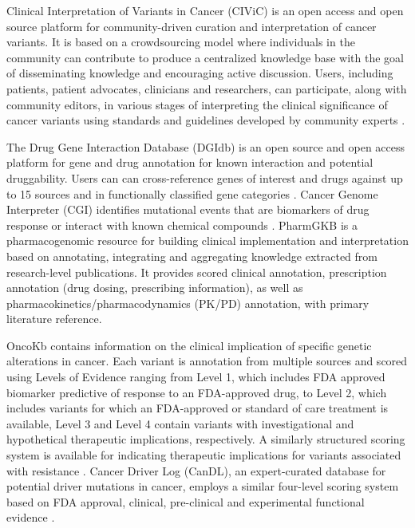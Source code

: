 \documentclass{article}
\begin{document}
Clinical Interpretation of Variants in Cancer (CIViC) is an open
access and open source platform for community-driven curation and
interpretation of cancer variants. It is based on a crowdsourcing
model where individuals in the community can contribute to produce a
centralized knowledge base with the goal of disseminating knowledge
and encouraging active discussion. Users, including patients, patient
advocates, clinicians and researchers, can participate, along with
community editors, in various stages of interpreting the clinical
significance of cancer variants using standards and guidelines
developed by community experts \parencite{Li2017-aw,Griffith2016-sy}.

The Drug Gene Interaction Database (DGIdb) is an open source and open
access platform for gene and drug annotation for known interaction and
potential druggability. Users can can cross-reference genes of
interest and drugs against up to 15 sources and in functionally
classified gene categories
\parencite{Wagner2016-fs,Griffith2013-uv}. Cancer Genome Interpreter (CGI)
identifies mutational events that are biomarkers of drug response or
interact with known chemical compounds
\parencite{Tamborero2017-ay}. PharmGKB is a pharmacogenomic resource for
building clinical implementation and interpretation based on
annotating, integrating and aggregating knowledge extracted from
research-level publications. It provides scored clinical annotation,
prescription annotation (drug dosing, prescribing information), as
well as pharmacokinetics/pharmacodynamics (PK/PD) annotation, with
primary literature reference.

OncoKb contains information on the clinical implication of specific
genetic alterations in cancer.  Each variant is annotation from
multiple sources and scored using Levels of Evidence ranging from
Level 1, which includes FDA approved biomarker predictive of response
to an FDA-approved drug, to Level 2, which includes variants for which
an FDA-approved or standard of care treatment is available, Level 3
and Level 4 contain variants with investigational and hypothetical
therapeutic implications, respectively. A similarly structured scoring
system is available for indicating therapeutic implications for
variants associated with resistance \parencite{Chakravarty2017-gx}. Cancer
Driver Log (CanDL), an expert-curated database for potential driver
mutations in cancer, employs a similar four-level scoring system based
on FDA approval, clinical, pre-clinical and experimental functional
evidence \parencite{Damodaran2015-so}.
\end{document}
